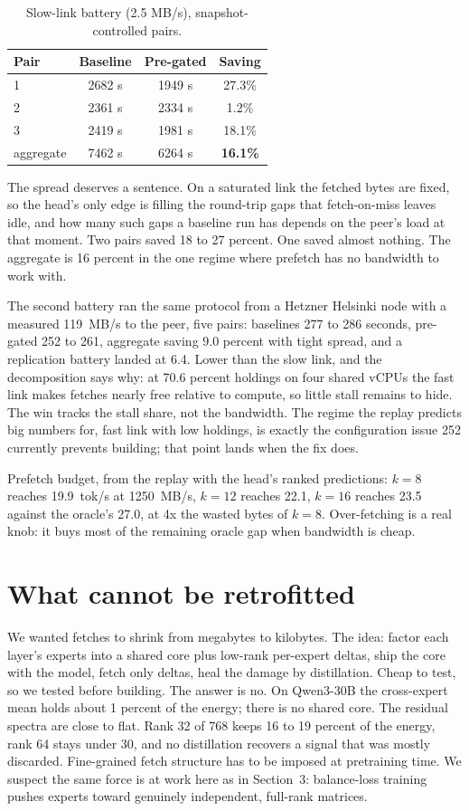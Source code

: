 \documentclass[11pt]{article}
\begin{document}
\begin{table}[h]
\centering\small
\begin{tabular}{lccc}
\toprule
Pair & Baseline & Pre-gated & Saving \\
\midrule
1 & 2682 s & 1949 s & 27.3\% \\
2 & 2361 s & 2334 s & 1.2\% \\
3 & 2419 s & 1981 s & 18.1\% \\
aggregate & 7462 s & 6264 s & \textbf{16.1\%} \\
\bottomrule
\end{tabular}
\caption{Slow-link battery (2.5 MB/s), snapshot-controlled pairs.}
\end{table}

The spread deserves a sentence. On a saturated link the fetched bytes are fixed, so the head's only edge is filling the round-trip gaps that fetch-on-miss leaves idle, and how many such gaps a baseline run has depends on the peer's load at that moment. Two pairs saved 18 to 27 percent. One saved almost nothing. The aggregate is 16 percent in the one regime where prefetch has no bandwidth to work with.

The second battery ran the same protocol from a Hetzner Helsinki node with a measured 119~MB/s to the peer, five pairs: baselines 277 to 286 seconds, pre-gated 252 to 261, aggregate saving 9.0 percent with tight spread, and a replication battery landed at 6.4. Lower than the slow link, and the decomposition says why: at 70.6 percent holdings on four shared vCPUs the fast link makes fetches nearly free relative to compute, so little stall remains to hide. The win tracks the stall share, not the bandwidth. The regime the replay predicts big numbers for, fast link with low holdings, is exactly the configuration issue 252 currently prevents building; that point lands when the fix does.

Prefetch budget, from the replay with the head's ranked predictions: $k=8$ reaches 19.9~tok/s at 1250~MB/s, $k=12$ reaches 22.1, $k=16$ reaches 23.5 against the oracle's 27.0, at 4x the wasted bytes of $k=8$. Over-fetching is a real knob: it buys most of the remaining oracle gap when bandwidth is cheap.

\section{What cannot be retrofitted}
We wanted fetches to shrink from megabytes to kilobytes. The idea: factor each layer's experts into a shared core plus low-rank per-expert deltas, ship the core with the model, fetch only deltas, heal the damage by distillation. Cheap to test, so we tested before building. The answer is no. On Qwen3-30B the cross-expert mean holds about 1 percent of the energy; there is no shared core. The residual spectra are close to flat. Rank 32 of 768 keeps 16 to 19 percent of the energy, rank 64 stays under 30, and no distillation recovers a signal that was mostly discarded. Fine-grained fetch structure has to be imposed at pretraining time. We suspect the same force is at work here as in Section~3: balance-loss training pushes experts toward genuinely independent, full-rank matrices.
\end{document}
